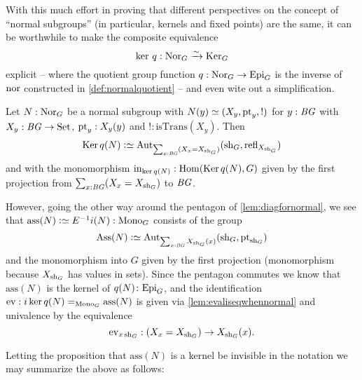 With this much effort in proving that different perspectives on the concept of ``normal subgroups'' (in particular, kernels and fixed points) are the same, it can be worthwhile to make the composite equivalence
$$\ker\,q:\typenormal_G\we\typekernel_G$$
explicit -- where the quotient group function $q:\mathrm{Nor}_G\to\mathrm{Epi}_G$ is the inverse of $\nor$ constructed in \cref{def:normalquotient} --  and even wite out a simplification.

Let $N:\mathrm{Nor}_G$ be a normal subgroup with $N(y)\oldequiv (X_y,\pt_y,!)$ for $y:\mathit{B}\mathit{G}$ with $X_y:\mathit{B}\mathit{G}\to\mathrm{Set}$, $\mathrm{pt}_y:X_y(y)$ and $!:\mathrm{isTrans}(X_y)$.
Then
$$\Ker q(N)\defequi\aut_{\sum_{x:\BG}(X_x=X_{\sh_G})}(\sh_G,\refl{X_{\sh_G}})
$$
and with the monomorphism $\incl_{\ker q(N)}:\Hom(\Ker q(N),G)$ given by the first projection from $\sum_{x:\mathit{B}\mathit{G}}(X_x=X_{\mathrm{sh}_G})$ to $\mathit{B}\mathit{G}$.

However, going the other way around the pentagon of \cref{lem:diagfornormal}, we see that $\mathrm{ass}(N)\defequi E^{-1}i(N):\typemono_G$ consists of the group
$$\mathrm{Ass}(N)\defequi\aut_{\sum_{x:\BG}X_{\sh_G}(x)}(\sh_G,\pt_{\sh_G})
$$
and the monomorphism into $G$ given by the first projection (monomorphism because $X_{\mathrm{sh}_G}$ has values in sets).  Since the pentagon commutes we know that $\mathrm{ass}(N)$ is the kernel of $q(N)\colon\mathrm{Epi}_G$, and the identification $\mathrm{ev}:i\ker q(N)=_{\typemono_G}\mathrm{ass}(N)$ is given via \cref{lem:evaliseqwhennormal} and univalence by the equivalence
$$\mathrm{ev}_{x\,\sh_G}:(X_x=X_{\sh_G})\to X_{\sh_G}(x)%
.$$



Letting the proposition that $\mathrm{ass}(N)$ is a kernel be invisible in the notation we may summarize the above as follows:

